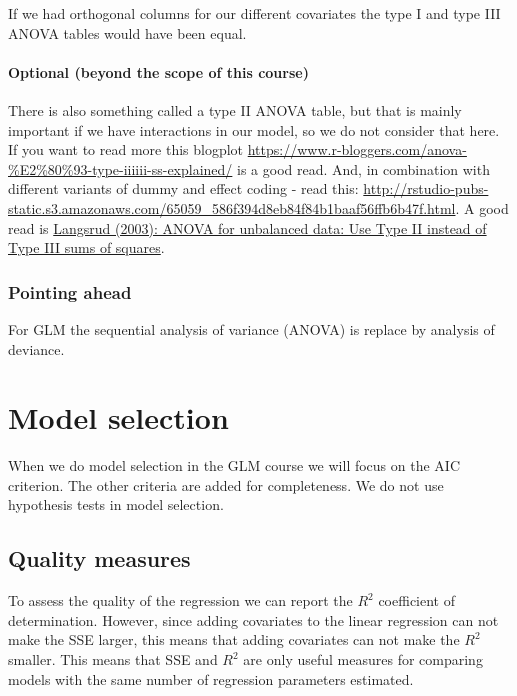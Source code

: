 \documentclass[
]{article}
\begin{document}
If we had orthogonal columns for our different covariates the type I and
type III ANOVA tables would have been equal.

\hypertarget{optional-beyond-the-scope-of-this-course}{%
\paragraph{Optional (beyond the scope of this
course)}\label{optional-beyond-the-scope-of-this-course}}

There is also something called a type II ANOVA table, but that is mainly
important if we have interactions in our model, so we do not consider
that here. If you want to read more this blogplot
\url{https://www.r-bloggers.com/anova-\%E2\%80\%93-type-iiiiii-ss-explained/}
is a good read. And, in combination with different variants of dummy and
effect coding - read this:
\url{http://rstudio-pubs-static.s3.amazonaws.com/65059_586f394d8eb84f84b1baaf56ffb6b47f.html}.
A good read is
\href{https://link.springer.com/article/10.1023/A:1023260610025}{Langsrud
(2003): ANOVA for unbalanced data: Use Type II instead of Type III sums
of squares}.

\hypertarget{pointing-ahead}{%
\subsubsection{Pointing ahead}\label{pointing-ahead}}

For GLM the sequential analysis of variance (ANOVA) is replace by
analysis of deviance.

\hypertarget{model-selection}{%
\section{Model selection}\label{model-selection}}

When we do model selection in the GLM course we will focus on the AIC
criterion. The other criteria are added for completeness. We do not use
hypothesis tests in model selection.

\hypertarget{quality-measures}{%
\subsection{Quality measures}\label{quality-measures}}

To assess the quality of the regression we can report the \(R^2\)
coefficient of determination. However, since adding covariates to the
linear regression can not make the SSE larger, this means that adding
covariates can not make the \(R^2\) smaller. This means that SSE and
\(R^2\) are only useful measures for comparing models with the same
number of regression parameters estimated.
\end{document}
